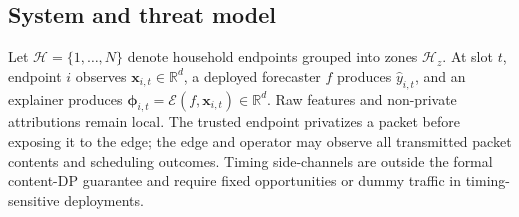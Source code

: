 \documentclass[conference]{IEEEtran}
\begin{document}
\subsection{System and threat model}

Let $\mathcal H=\{1,\ldots,N\}$ denote household endpoints grouped into
zones $\mathcal H_z$. At slot $t$, endpoint $i$ observes
$\bm x_{i,t}\in\mathbb R^d$, a deployed forecaster $f$ produces
$\hat y_{i,t}$, and an explainer produces
$\bm\phi_{i,t}=\mathcal E(f,\bm x_{i,t})\in\mathbb R^d$. Raw features and
non-private attributions remain local. The trusted endpoint privatizes a
packet before exposing it to the edge; the edge and operator may observe
all transmitted packet contents and scheduling outcomes. Timing
side-channels are outside the formal content-DP guarantee and require
fixed opportunities or dummy traffic in timing-sensitive deployments.
\end{document}
